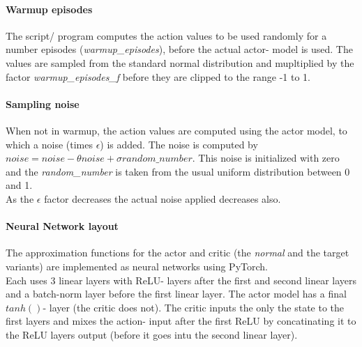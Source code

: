 \documentclass[a4paper]{article}
\begin{document}
\paragraph{Warmup episodes}
The script/ program computes the action values to be used randomly for
a number episodes (\textit{warmup\_episodes}), before the actual actor- model
is used. The values are sampled from the standard normal distribution and
mupltiplied by the factor \textit{warmup\_episodes\_f} before they are clipped
to the range -1 to 1.

\paragraph{Sampling noise}
When not in warmup, the action values are computed using the actor model,
to which a noise (times $\epsilon$) is added. The noise is computed by
$noise = noise -\theta noise + \sigma random\_number$. This noise is
initialized with zero and the \textit{random\_number} is taken from the
usual uniform distribution between 0 and 1.
\\
As the $\epsilon$ factor decreases the actual noise applied decreases also.

\paragraph{Neural Network layout}
The approximation functions for the actor and critic (the \textit{normal}
and the target variants) are implemented as neural networks using PyTorch.
\\
Each uses 3 linear layers with ReLU- layers after the first and second linear
layers and a batch-norm layer before the first linear layer.
The actor model has a final $tanh()$- layer (the critic does not).
The critic inputs the only the state to the first layers and mixes the action-
input after the first ReLU by concatinating it to the ReLU layers output
(before it goes intu the second linear layer).
\\
\end{document}
